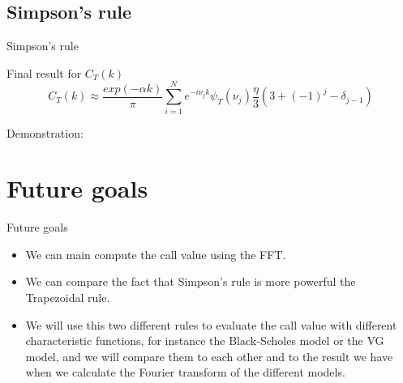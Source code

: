 \documentclass{beamer}
\begin{document}
\subsection{Simpson's rule}
\begin{frame}{Simpson's rule}
\begin{block}{Final result for $C_T(k)$}
\begin{equation}
C_T(k) \approx \frac{exp(- \alpha k)}{\pi}\sum_{i=1}^N e^{-i\nu_jk} \psi_T(\nu_j)\frac{\eta}{3}(3+(-1)^j-\delta_{j-1})
\end{equation}
\end{block}
Demonstration:
\newline
{}
\end{frame}
\section{Future goals}
\begin{frame}{Future goals}
\begin{itemize}
\item We can main compute the call value using the FFT.
\item We can compare the fact that Simpson's rule is more powerful the Trapezoidal rule.
\item We will use this two different rules to evaluate the call value with different characteristic functions, for instance the \alert{Black-Scholes} model or the \alert{VG} model, and we will compare them to each other and to the result we have when we calculate the Fourier transform of the different models. 
\end{itemize}
\end{frame}
\end{document}
